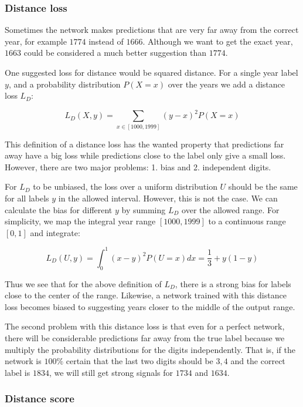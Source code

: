 
\subsubsection{Distance loss}

Sometimes the network makes predictions that are very far away from the correct year, for example $1774$ instead of $1666$. Although we want to get the exact year, $1663$ could be considered a much better suggestion than $1774$.

One suggested loss for distance would be squared distance. For a single year label $y$, and a probability distribution $P(X=x)$ over the years we add a distance loss $L_D$:

\[
L_D(X, y) = \sum_{x \in [1000, 1999]} (y-x)^2 P(X=x)
\]

This definition of a distance loss has the wanted property that predictions far away have a big loss while predictions close to the label only give a small loss. However, there are two major problems: 1. bias and 2. independent digits.

For $L_D$ to be unbiased, the loss over a uniform distribution $U$ should be the same for all labels $y$ in the allowed interval. However, this is not the case. We can calculate the bias for different $y$ by summing $L_D$ over the allowed range. For simplicity, we map the integral year range $[1000, 1999]$ to a continuous range $[0,1]$ and integrate:

\[
L_D(U, y) = \int_0^1 (x-y)^2 P(U=x) dx = \frac{1}{3} + y(1-y)
\]

Thus we see that for the above definition of $L_D$, there is a strong bias for labels close to the center of the range. Likewise, a network trained with this distance loss becomes biased to suggesting years closer to the middle of the output range.

The second problem with this distance loss is that even for a perfect network, there will be considerable predictions far away from the true label because we multiply the probability distributions for the digits independently. That is, if the network is $100\%$ certain that the last two digits should be $3, 4$ and the correct label is $1834$, we will still get strong signals for $1734$ and $1634$.

\subsubsection{Distance score}


